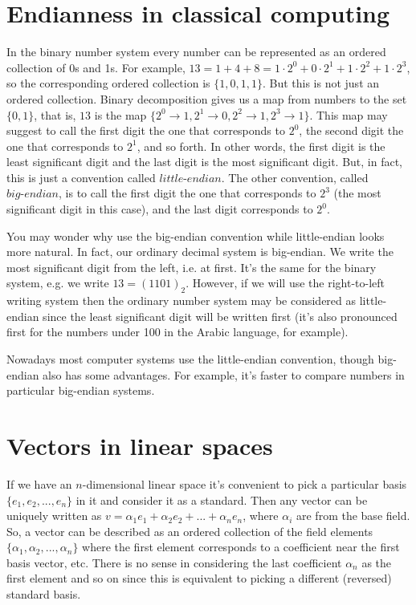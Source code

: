 \documentclass{article}
\begin{document}
\section{Endianness in classical computing}
In the binary number system every number can be represented as an ordered collection of 0s and 1s. 
For example, $13 = 1 + 4 + 8 =  1 \cdot 2^0 + 0 \cdot 2^1 + 1 \cdot 2^2 + 1 \cdot 2^3$, 
so the corresponding ordered collection is $\{1, 0, 1, 1\}$. But this is not just an ordered collection. 
Binary decomposition gives us a map from numbers to the set $\{0,1\}$, 
that is, $13$ is the map $\{2^0\rightarrow 1, 2^1\rightarrow0, 2^2\rightarrow1, 2^3\rightarrow1\}$. 
This map may suggest to call the first digit the one that corresponds to $2^0$, 
the second digit the one that corresponds to $2^1$, and so forth. 
In other words, the first digit is the least significant digit and the last digit is the most significant digit. 
But, in fact, this is just a convention called $\textit{little-endian}$. 
The other convention, called $\textit{big-endian}$, is to call the first digit the one that corresponds to $2^3$ (the most significant digit in this case), 
and the last digit corresponds to $2^0$. 

You may wonder why use the big-endian convention while little-endian looks more natural. 
In fact, our ordinary decimal system is big-endian. We write the most significant digit from the left, i.e. at first. 
It's the same for the binary system, e.g. we write $13 = (1101)_2$.
However, if we will use the right-to-left writing system then the ordinary number system may be considered as little-endian since the least significant digit will be written first (it's also pronounced first for the numbers under 100 in the Arabic language, for example).

Nowadays most computer systems use the little-endian convention, though big-endian also has some advantages. 
For example, it's faster to compare numbers in particular big-endian systems. 

\section{Vectors in linear spaces}
If we have an $n$-dimensional linear space it's convenient to pick a particular basis $\{e_1, e_2, ... , e_n\}$ in it and consider it as a standard. 
Then any vector can be uniquely written as $v = \alpha_1 e_1 + \alpha_2 e_2 + ... + \alpha_n e_n$, where $\alpha_i$ are from the base field. 
So, a vector can be described as an ordered collection of the field elements $\{\alpha_1, \alpha_2, ... ,\alpha_n\}$ 
where the first element corresponds to a coefficient near the first basis vector, etc. 
There is no sense in considering the last coefficient $\alpha_n$ as the first element and so on since this is equivalent to picking a different (reversed) standard basis. 
\end{document}
